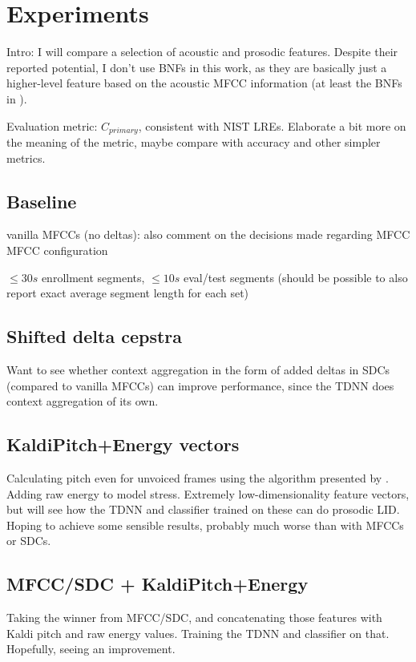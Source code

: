 \documentclass[bsc,frontabs,twoside,singlespacing,parskip,deptreport]{infthesis}
\begin{document}
\chapter{Experiments}{
  Intro: I will compare a selection of acoustic and prosodic features. Despite their reported potential, I don't use BNFs in this work, as they are basically just a higher-level feature based on the acoustic MFCC information (at least the BNFs in \cite{Snyder_et_al_2018}).

  Evaluation metric: $C_{primary}$, consistent with NIST LREs. Elaborate a bit more on the meaning of the metric, maybe compare with accuracy and other simpler metrics.

  \section{Baseline}{
    vanilla MFCCs (no deltas): also comment on the decisions made regarding MFCC MFCC configuration

    $\leq 30s$ enrollment segments, $\leq 10s$ eval/test segments (should be possible to also report exact average segment length for each set)
  }

  \section{Shifted delta cepstra}{
    Want to see whether context aggregation in the form of added deltas in SDCs (compared to vanilla MFCCs) can improve performance, since the TDNN does context aggregation of its own.
  }

  \section{KaldiPitch+Energy vectors}{
    Calculating pitch even for unvoiced frames using the algorithm presented by \cite{Ghahremani_et_al_2014}. Adding raw energy to model stress. Extremely low-dimensionality feature vectors, but will see how the TDNN and classifier trained on these can do prosodic LID. Hoping to achieve some sensible results, probably much worse than with MFCCs or SDCs.
  }
  
  \section{MFCC/SDC + KaldiPitch+Energy}{
    Taking the winner from MFCC/SDC, and concatenating those features with Kaldi pitch and raw energy values. Training the TDNN and classifier on that. Hopefully, seeing an improvement.
  }
  
}
\end{document}
